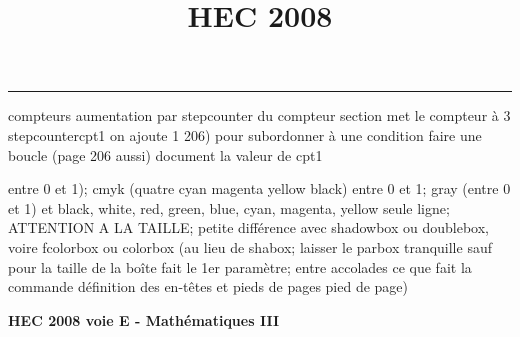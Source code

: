 \documentclass[11pt]{article}%
\title{\bf \vspace{-1cm} HEC 2008} %
\author{} %
\date{} %
\renewcommand{\headrulewidth}{0pt}%
\renewcommand{\footrulewidth}{0.4pt}%
\begin{document}
\maketitle %
\vspace{-1.2cm}\hrule %
\thispagestyle{fancy}

\vspace*{.4cm}


compteurs%
aumentation par stepcounter du compteur section%
met le compteur à 3%
stepcounter{cpt1} on ajoute 1%
206) pour subordonner à une condition %
faire une boucle (page 206 aussi) %
document la valeur de cpt1 

entre 0 et 1); cmyk (quatre cyan magenta yellow black) entre 0 et 1;
gray (entre 0 et 1) et black, white, red, green, blue, cyan, magenta,
yellow%
seule ligne; ATTENTION A LA TAILLE; petite différence avec shadowbox ou
doublebox, voire fcolorbox ou colorbox (au lieu de shabox; laisser le
parbox tranquille sauf pour la taille de la boîte
\newcommand{\Tbox}[1]{\begin{center} \shabox{\parbox{0.6
\linewidth}{#1}} \end{center}} %
fait le 1er paramètre; entre accolades ce que fait la commande
définition des en-têtes et pieds de pages\pagestyle{fancy}
\chead{}
\rfoot[ \ \thepage]{\thepage}
\cfoot{}
\lfoot{}
\thispagestyle{fancy} %
pied de page)\renewcommand{\footrulewidth}{0.4pt}
\renewcommand{\headrulewidth}{0.4pt}

\bi\begin{center}\textbf{ \Large HEC 2008 voie E - Mathématiques III}
\end{center}\bi\bi
\end{document}
